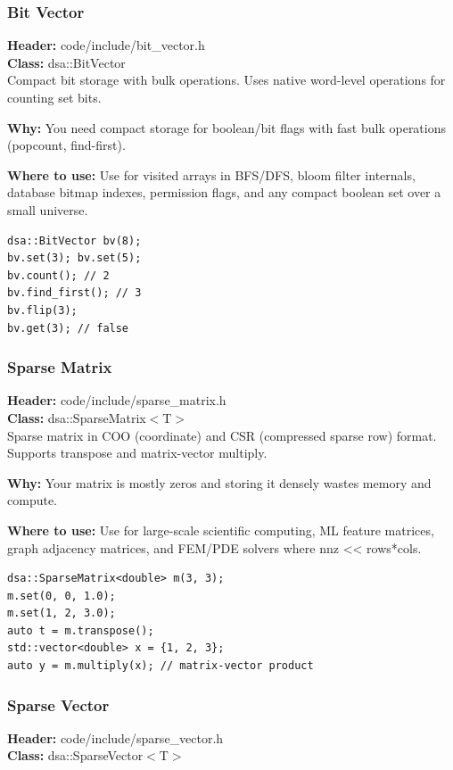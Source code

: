 \documentclass[11pt]{article}
\begin{document}
\subsubsection{Bit Vector}
\textbf{Header:} code/include/bit\_vector.h\\
\textbf{Class:} dsa::BitVector\\

Compact bit storage with bulk operations. Uses native word-level operations for counting set bits.

\textbf{Why:} You need compact storage for boolean/bit flags with fast bulk operations (popcount, find-first). \par \textbf{Where to use:} Use for visited arrays in BFS/DFS, bloom filter internals, database bitmap indexes, permission flags, and any compact boolean set over a small universe.

\begin{lstlisting}
dsa::BitVector bv(8);
bv.set(3); bv.set(5);
bv.count(); // 2
bv.find_first(); // 3
bv.flip(3);
bv.get(3); // false
\end{lstlisting}

\subsubsection{Sparse Matrix}
\textbf{Header:} code/include/sparse\_matrix.h\\
\textbf{Class:} dsa::SparseMatrix$<$T$>$\\

Sparse matrix in COO (coordinate) and CSR (compressed sparse row) format. Supports transpose and matrix-vector multiply.

\textbf{Why:} Your matrix is mostly zeros and storing it densely wastes memory and compute. \par \textbf{Where to use:} Use for large-scale scientific computing, ML feature matrices, graph adjacency matrices, and FEM/PDE solvers where nnz << rows*cols.

\begin{lstlisting}
dsa::SparseMatrix<double> m(3, 3);
m.set(0, 0, 1.0);
m.set(1, 2, 3.0);
auto t = m.transpose();
std::vector<double> x = {1, 2, 3};
auto y = m.multiply(x); // matrix-vector product
\end{lstlisting}

\subsubsection{Sparse Vector}
\textbf{Header:} code/include/sparse\_vector.h\\
\textbf{Class:} dsa::SparseVector$<$T$>$\\
\end{document}
